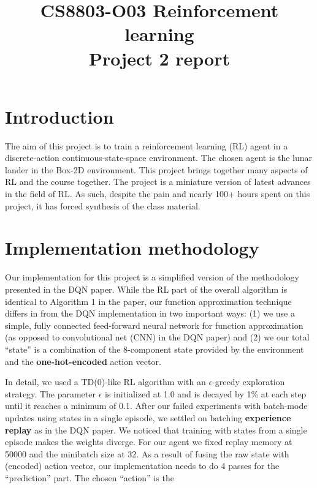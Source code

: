 \documentclass[conference]{IEEEtran}
\begin{document}
\title{CS8803-O03 Reinforcement learning\\Project 2 report}

\author{
}
\maketitle


\IEEEpeerreviewmaketitle
\section{Introduction}
The aim of this project is to train a reinforcement learning (RL) agent in a discrete-action continuous-state-space environment. The chosen agent is the lunar lander in the Box-2D environment. This project brings together many aspects of RL and the course together. The project is a miniature version of latest advances in the field of RL. As such, despite the pain and nearly 100+ hours spent on this project, it has forced synthesis of the class material.
\section{Implementation methodology}
Our implementation for this project is a simplified version of the methodology presented in the DQN paper\cite{dqn}. While the RL part of the overall algorithm is identical to Algorithm 1 in the paper, our function approximation technique differs in from the DQN implementation in two important ways: (1) we use a simple, fully connected feed-forward neural network for function approximation (as opposed to convolutional net (CNN) in the DQN paper) and (2) we our total ``state'' is a combination of the 8-component state provided by the environment and the {\bf one-hot-encoded} action vector. 

In detail, we used a TD(0)-like RL algorithm with an $\epsilon$-greedy exploration strategy. The parameter $\epsilon$ is initialized at 1.0 and is decayed by 1\% at each step until it reaches a minimum of 0.1. After our failed experiments with batch-mode updates using states in a single episode, we settled on batching {\bf experience replay} as in the DQN paper. We noticed that training with states from a single episode makes the weights diverge. For our agent we fixed replay memory at 50000 and the minibatch size at 32. As a result of fusing the raw state with (encoded) action vector, our implementation needs to do 4 passes for the ``prediction'' part. The chosen ``action'' is the 
\end{document}
